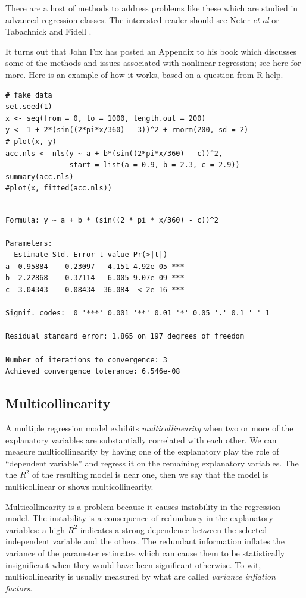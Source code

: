 \documentclass[captions=tableheading]{scrbook}
\begin{document}
There are a host of methods to address problems like these which are studied in advanced regression classes. The interested reader should see Neter \emph{et al} \cite{Neter1996} or Tabachnick and Fidell \cite{Tabachnick2006}. 

It turns out that John Fox has posted an Appendix to his book \cite{Fox2002} which discusses some of the methods and issues associated with nonlinear regression; see \href{http://cran.r-project.org/doc/contrib/Fox-Companion/appendix.html}{here} for more.  Here is an example of how it works, based on a question from R-help.


\lstset{language=R}
\begin{lstlisting}
# fake data 
set.seed(1) 
x <- seq(from = 0, to = 1000, length.out = 200) 
y <- 1 + 2*(sin((2*pi*x/360) - 3))^2 + rnorm(200, sd = 2)
# plot(x, y)
acc.nls <- nls(y ~ a + b*(sin((2*pi*x/360) - c))^2, 
               start = list(a = 0.9, b = 2.3, c = 2.9))
summary(acc.nls)
#plot(x, fitted(acc.nls))
\end{lstlisting}


\begin{verbatim}
 
Formula: y ~ a + b * (sin((2 * pi * x/360) - c))^2

Parameters:
  Estimate Std. Error t value Pr(>|t|)    
a  0.95884    0.23097   4.151 4.92e-05 ***
b  2.22868    0.37114   6.005 9.07e-09 ***
c  3.04343    0.08434  36.084  < 2e-16 ***
---
Signif. codes:  0 '***' 0.001 '**' 0.01 '*' 0.05 '.' 0.1 ' ' 1 

Residual standard error: 1.865 on 197 degrees of freedom

Number of iterations to convergence: 3 
Achieved convergence tolerance: 6.546e-08
\end{verbatim}
\subsection{Multicollinearity}
\label{sec-12-9-3}
\label{sub-Multicollinearity}


A multiple regression model exhibits \emph{multicollinearity} when two or more of the explanatory variables are substantially correlated with each other. We can measure multicollinearity by having one of the explanatory play the role of ``dependent variable'' and regress it on the remaining explanatory variables. The the \(R^{2}\) of the resulting model is near one, then we say that the model is multicollinear or shows multicollinearity.

Multicollinearity is a problem because it causes instability in the regression model. The instability is a consequence of redundancy in the explanatory variables: a high \(R^{2}\) indicates a strong dependence between the selected independent variable and the others. The redundant information inflates the variance of the parameter estimates which can cause them to be statistically insignificant when they would have been significant otherwise. To wit, multicollinearity is usually measured by what are called \emph{variance inflation factors}.
\end{document}
